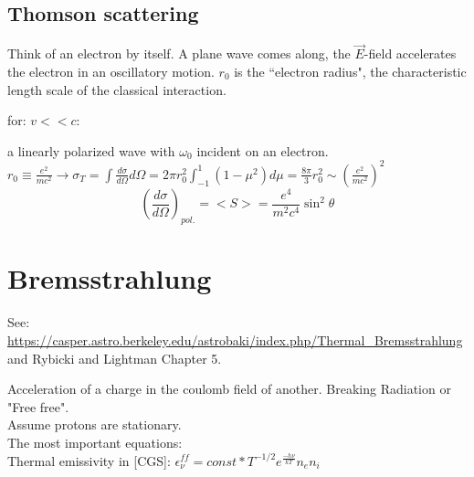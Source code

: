 \documentclass[12pt]{report}
\begin{document}
 \subsection{Thomson scattering}
  Think of an electron by itself. A plane wave comes along, the $\vec{E}$-field accelerates the electron in an oscillatory motion.  $r_0$ is the ``electron radius",  the characteristic length scale of the classical interaction.
  
 for: \( v<<c\):
 
 a linearly polarized wave with $\omega_0$ incident on an electron.\\
 \(r_0\equiv \frac{e^2}{mc^2}\rightarrow \sigma_T=\int\frac{d\sigma}{d\Omega}d\Omega= 2\pi r_0^2 \int_{-1}^1(1-\mu^2)d\mu=\frac{8\pi}{3}r_0^2 \sim (\frac{e^2}{mc^2})^2\)\\
 
 \[(\frac{d\sigma}{d\Omega})_{pol.}=<S>=\frac{e^4}{m^2c^4}\sin^2\theta\]
 


\section{Bremsstrahlung}

See: \url{https://casper.astro.berkeley.edu/astrobaki/index.php/Thermal_Bremsstrahlung} and Rybicki and Lightman Chapter 5. 

Acceleration of a charge in the coulomb field of another. Breaking Radiation or "Free free".\\
Assume protons are stationary.\\
The most important equations:\\
Thermal emissivity in [CGS]: \( \boxed{\epsilon_\nu^{ff}=const*T^{-1/2}e^{\frac{-h\nu}{kT}}n_en_i}\)\\
\end{document}
